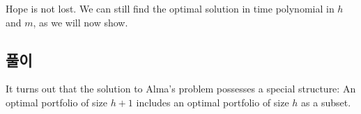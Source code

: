 \documentclass[12pt]{article} %
\newif\ifEN
\newtheorem{lemma}{Lemma}
\theoremstyle{definition}
\newtheorem{lemma}{기본정리}
\theoremstyle{definition}
\begin{document}
Hope is not lost. We can still find the optimal solution in time polynomial in $h$ and $m$, as we will now show.

\ifEN \subsection{Polynomial-time solution}  \else \subsection{풀이} \fi
It turns out that the solution to Alma's problem possesses a special structure: An optimal portfolio of size $h+1$ includes an optimal portfolio of size $h$ as a subset.
%
\end{document}
